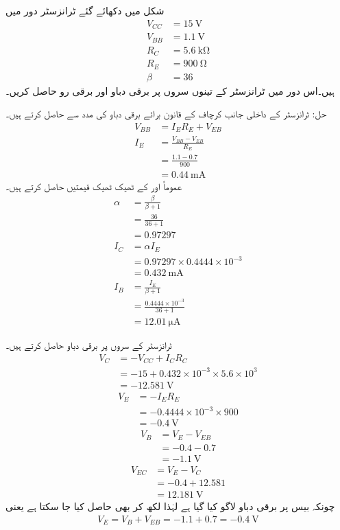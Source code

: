 شکل    میں دکھائے گئے ٹرانزسٹر دور میں
\begin{align*}
V_{CC} &=\SI{15}{\volt}\\
V_{BB} &=\SI{1.1}{\volt}\\
R_C&=\SI{5.6}{\kilo \ohm} \\
R_E &=\SI{900}{\ohm} \\
\beta &=36
\end{align*}
 ہیں۔اس دور میں ٹرانزسٹر کے تینوں سروں پر برقی دباو اور برقی رو حاصل کریں۔

حل:
ٹرانزسٹر کے داخلی جانب کرچاف کے قانون برائے برقی دباو کی مدد سے  حاصل کرتے ہیں۔
\begin{align*}
V_{BB} &=I_{E}R_{E}+V_{EB}\\
I_E&=\frac{V_{BB}-V_{EB}}{R_E}\\
&=\frac{1.1-0.7}{900}\\
&=\SI{0.44}{\milli \ampere}
\end{align*}
عموماً اور    کے ٹھیک ٹھیک قیمتیں حاصل کرتے ہیں۔
\begin{align*}
\alpha&=\frac{\beta}{\beta+1}\\
&=\frac{36}{36+1}\\
&=\num{0.97297}
\\
I_C&=\alpha I_E\\
&=0.97297 \times  0.4444  \times 10^{-3}\\
&=\SI{0.432}{\milli \ampere}\\
I_B&=\frac{I_E}{\beta+1}\\
&=\frac{0.4444 \times 10^{-3}}{36+1}\\
&=\SI{12.01}{\micro \ampere}
\end{align*}

ٹرانزسٹر کے سروں پر برقی دباو حاصل کرتے ہیں۔
\begin{align*}
V_C&=-V_{CC}+I_{C}R_{C}\\
&=-15+0.432 \times 10^{-3} \times 5.6 \times 10^{3}\\
&=\SI{-12.581}{\volt}
\end{align*}
%
\begin{align*}
V_E&=-I_{E}R_{E}\\
&=-0.4444 \times 10^{-3} \times 900\\
&=\SI{-0.4}{\volt}
\end{align*}
%
\begin{align*}
V_B&=V_E-V_{EB}\\
&=-0.4-0.7\\
&=\SI{-1.1}{\volt}
\end{align*}
%
\begin{align*}
V_{EC}&=V_E-V_C\\
&=-0.4+12.581\\
&=\SI{12.181}{\volt}
\end{align*}
چونکہ بیس پر برقی دباو  لاگو کیا گیا ہے لہٰذا  لکھ کر بھی حاصل کیا جا سکتا ہے یعنی
\begin{align*}
V_E=V_B+V_{EB}=-1.1+0.7=\SI{-0.4}{\volt}
\end{align*}

